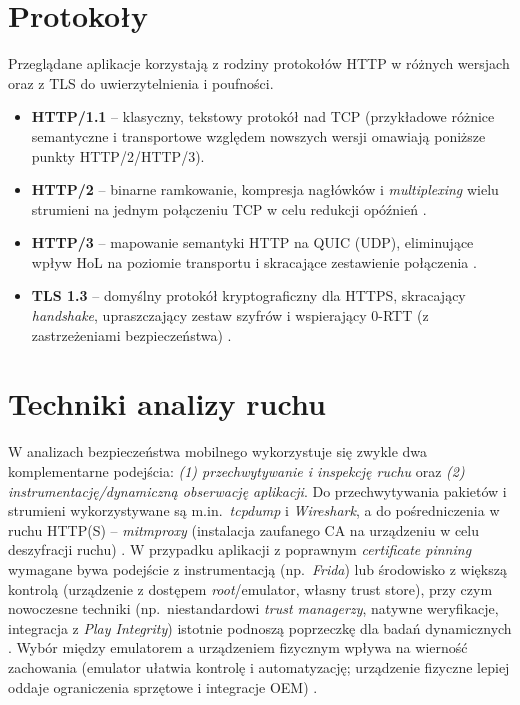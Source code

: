 \section{Protokoły}
Przeglądane aplikacje korzystają z rodziny protokołów HTTP w różnych wersjach oraz z TLS do uwierzytelnienia i poufności. 
\begin{itemize}
  \item \textbf{HTTP/1.1} – klasyczny, tekstowy protokół nad TCP (przykładowe różnice semantyczne i transportowe względem nowszych wersji omawiają poniższe punkty HTTP/2/HTTP/3). 
  \item \textbf{HTTP/2} – binarne ramkowanie, kompresja nagłówków i \emph{multiplexing} wielu strumieni na jednym połączeniu TCP w celu redukcji opóźnień \cite{RFC9113}.
  \item \textbf{HTTP/3} – mapowanie semantyki HTTP na QUIC (UDP), eliminujące wpływ HoL na poziomie transportu i skracające zestawienie połączenia \cite{RFC9114,RFC9000}. 
  \item \textbf{TLS 1.3} – domyślny protokół kryptograficzny dla HTTPS, skracający \emph{handshake}, upraszczający zestaw szyfrów i wspierający 0-RTT (z zastrzeżeniami bezpieczeństwa) \cite{RFC8446}.
\end{itemize}

\section{Techniki analizy ruchu}
W analizach bezpieczeństwa mobilnego wykorzystuje się zwykle dwa komplementarne podejścia: 
\emph{(1) przechwytywanie i inspekcję ruchu} oraz \emph{(2) instrumentację/dynamiczną obserwację aplikacji}. 
Do przechwytywania pakietów i strumieni wykorzystywane są m.in.\ \textit{tcpdump} i \textit{Wireshark}, a do pośredniczenia w ruchu HTTP(S) – \textit{mitmproxy} (instalacja zaufanego CA na urządzeniu w celu deszyfracji ruchu) \cite{tcpdump,WiresharkDocs,MitmproxyDocs,OWASPMASTGIntercept}. 
W przypadku aplikacji z poprawnym \emph{certificate pinning} wymagane bywa podejście z instrumentacją (np.\ \textit{Frida}) lub środowisko z większą kontrolą (urządzenie z dostępem \textit{root}/emulator, własny trust store), przy czym nowoczesne techniki (np.\ niestandardowi \emph{trust managerzy}, natywne weryfikacje, integracja z \emph{Play Integrity}) istotnie podnoszą poprzeczkę dla badań dynamicznych \cite{Frida,OWASPMASTGPinning}. 
Wybór między emulatorem a urządzeniem fizycznym wpływa na wierność zachowania (emulator ułatwia kontrolę i automatyzację; urządzenie fizyczne lepiej oddaje ograniczenia sprzętowe i integracje OEM) \cite{OWASPMASTGIntercept}.

